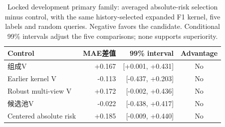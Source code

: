 \begin{table}[htbp]\centering\small
\caption{Locked development primary family: averaged absolute-risk selection minus control, with the same history-selected expanded F1 kernel, five labels and random queries. Negative favors the candidate. Conditional 99\% intervals adjust the five comparisons; none supports superiority.}\label{tab:step10primary}
\begin{tabular}{lrrc}\toprule
Control & MAE差值 & 99\% interval & Advantage \\ \midrule
组成V & +0.167 & [+0.001, +0.431] & No \\
Earlier kernel V & -0.113 & [-0.437, +0.203] & No \\
Robust multi-view V & +0.172 & [-0.002, +0.436] & No \\
候选池V & -0.022 & [-0.438, +0.417] & No \\
Centered absolute risk & +0.185 & [-0.009, +0.440] & No \\
\bottomrule\end{tabular}
\end{table}
